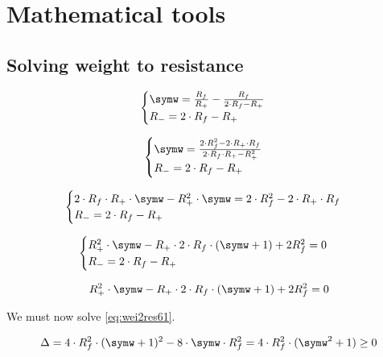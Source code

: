 \chapter{Mathematical tools}
\label{ap:other}
\clearpage

\section{Solving weight to resistance}\label{apsec:wei2res}

\begin{equation}\label{eq:wei2res3}
  \begin{cases}
    \symw=\frac{R_f}{R_+}-\frac{R_f}{2\cdot R_f -R_+}\\
    R_-=2\cdot R_f -R_+
  \end{cases}
\end{equation}


\begin{equation}\label{eq:wei2res4}
  \begin{cases}
    \symw=\frac{2\cdot R_f^2-2\cdot R_+\cdot R_f}{2\cdot R_f\cdot R_+ -R_+^2}\\
    R_-=2\cdot R_f -R_+
  \end{cases}
\end{equation}

\begin{equation}\label{eq:wei2res5}
  \begin{cases}
    2\cdot R_f\cdot R_+\cdot \symw -R_+^2\cdot \symw=2\cdot R_f^2-2\cdot R_+\cdot R_f\\
    R_-=2\cdot R_f -R_+
  \end{cases}
\end{equation}

\begin{equation}\label{eq:wei2res6}
  \begin{cases}
    R_+^2\cdot \symw - R_+\cdot 2\cdot R_f \cdot(\symw+1) + 2R_f^2 = 0\\
    R_-=2\cdot R_f -R_+
  \end{cases}
\end{equation}

\begin{equation}\label{eq:wei2res61}
  R_+^2\cdot \symw - R_+\cdot 2\cdot R_f \cdot(\symw+1) + 2R_f^2 = 0
\end{equation}

We must now solve \cref{eq:wei2res61}.

\begin{equation}\label{eq:wei2res61}
  \Delta = 4\cdot R_f^2\cdot(\symw+1)^2-8\cdot \symw\cdot R_f^2 = 4\cdot R_f^2\cdot(\symw^2+1) \ge 0
\end{equation}

